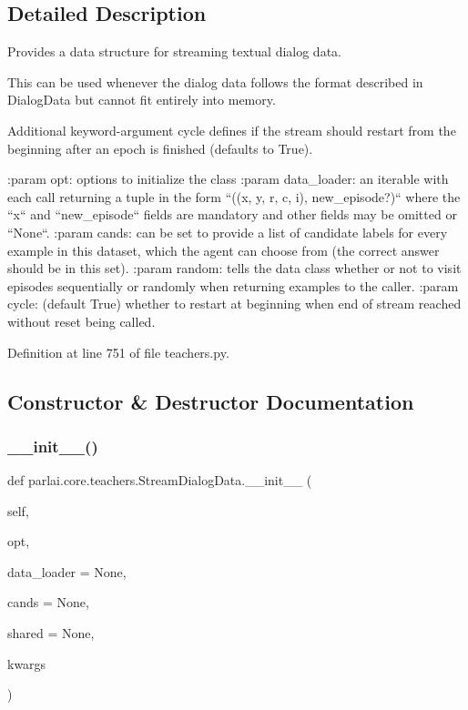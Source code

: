 \subsection{Detailed Description}
\begin{DoxyVerb}Provides a data structure for streaming textual dialog data.

This can be used whenever the dialog data follows the format described in
DialogData but cannot fit entirely into memory.

Additional keyword-argument cycle defines if the stream should restart from
the beginning after an epoch is finished (defaults to True).

:param opt:
    options to initialize the class
:param data_loader:
    an iterable with each call returning a tuple in the form
    ``((x, y, r, c, i), new_episode?)`` where the ``x`` and ``new_episode``
    fields are mandatory and other fields may be omitted or ``None``.
:param cands:
    can be set to provide a list of candidate labels for every example in
    this dataset, which the agent can choose from (the correct answer
    should be in this set).
:param random:
    tells the data class whether or not to visit episodes sequentially or
    randomly when returning examples to the caller.
:param cycle:
    (default True) whether to restart at beginning when end of stream
    reached without reset being called.
\end{DoxyVerb}
 

Definition at line 751 of file teachers.\+py.



\subsection{Constructor \& Destructor Documentation}
\mbox{\label{classparlai_1_1core_1_1teachers_1_1StreamDialogData_a72324ec2775d16b31d1d18287a8f84e9}} 
\subsubsection{\texorpdfstring{\+\_\+\+\_\+init\+\_\+\+\_\+()}{\_\_init\_\_()}}
{\footnotesize\ttfamily def parlai.\+core.\+teachers.\+Stream\+Dialog\+Data.\+\_\+\+\_\+init\+\_\+\+\_\+ (\begin{DoxyParamCaption}\item[{}]{self,  }\item[{}]{opt,  }\item[{}]{data\+\_\+loader = {\ttfamily None},  }\item[{}]{cands = {\ttfamily None},  }\item[{}]{shared = {\ttfamily None},  }\item[{}]{kwargs }\end{DoxyParamCaption})}



